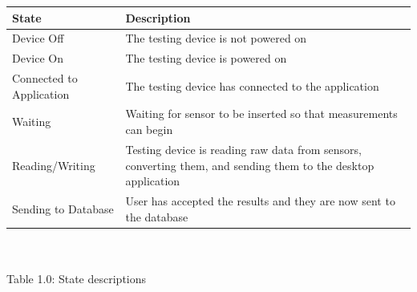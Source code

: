 \documentclass[12pt]{article}
\begin{document}
\begin{tabular}{| p{} | p{}|}
  \hline
  \rowcolor[gray]{0.9}
  State & Description \\
  \hline
  Device Off & The testing device is not powered on\\
  \hline
  Device On &  The testing device is powered on\\
  \hline
  Connected to Application & The testing device has connected to the application \\
  \hline
  Waiting & Waiting for sensor to be inserted so that measurements can begin \\
  \hline
  Reading/Writing & Testing device is reading raw data from sensors, converting them, and sending them to the desktop application \\
  \hline
  Sending to Database & User has accepted the results and they are now sent to the database \\
  \hline
\end{tabular}
\\\\ \indent Table 1.0: State descriptions\\ \\ \\
\end{document}
